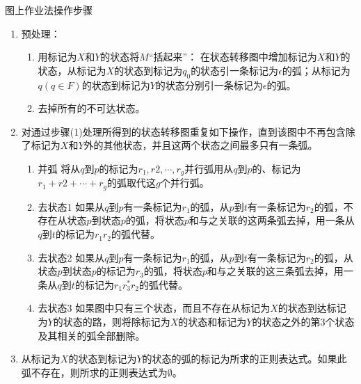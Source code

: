 图上作业法操作步骤
\begin{enumerate}
	\item 预处理：
		\begin{enumerate}
			\item 用标记为$X$和$Y$的状态将$M$“括起来”：
		    \subitem{-} 在状态转移图中增加标记为$X$和$Y$的状态，从标记为$X$的状态到标记为$q_0$的状态引一条标记为$\epsilon$的弧；从标记为$q(q\in F)$的状态到标记为$Y$的状态分别引一条标记为$\epsilon$的弧。
			\item 去掉所有的不可达状态。
		\end{enumerate}
	\item 对通过步骤(1)处理所得到的状态转移图重复如下操作，直到该图中不再包含除了标记为$X$和$Y$外的其他状态，并且这两个状态之间最多只有一条弧。 
		\begin{enumerate}
			\item 并弧
			\subitem{-} 将从$q$到$p$的标记为$r_1,r2,\cdots,r_g$并行弧用从$q$到$p$的、标记为$r_1+r2+\cdots+r_g$的弧取代这$g$个并行弧。 
			\item 去状态1
			\subitem{-} 如果从$q$到$p$有一条标记为$r_1$的弧，从$p$到$t$有一条标记为$r_2$的弧，不存在从状态$p$到状态$p$的弧，将状态$p$和与之关联的这两条弧去掉，用一条从$q$到$t$的标记为$r_1r_2$的弧代替。 
			\item 去状态2
			\subitem{-} 如果从$q$到$p$有一条标记为$r_1$的弧，从$p$到$t$有一条标记为$r_2$的弧，从状态$p$到状态$p$的标记为$r_3$的弧，将状态$p$和与之关联的这三条弧去掉，用一条从$q$到$t$的标记为$r_1r_3^\ast r_2$的弧代替。 
			\item 去状态3
			\subitem{-} 如果图中只有三个状态，而且不存在从标记为$X$的状态到达标记为$Y$的状态的路，则将除标记为$X$的状态和标记为$Y$的状态之外的第3个状态及其相关的弧全部删除。 	
		\end{enumerate}	
	\item 从标记为$X$的状态到标记为$Y$的状态的弧的标记为所求的正则表达式。如果此弧不存在，则所求的正则表达式为$\emptyset$。 	
\end{enumerate}


